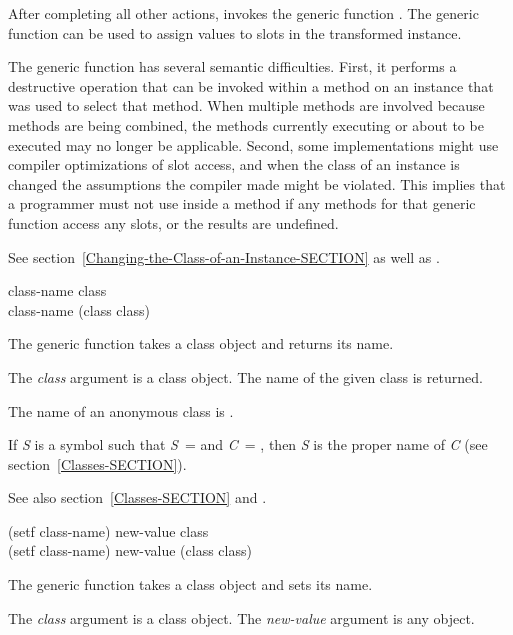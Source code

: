 \begin{defun}
After completing all other actions,  invokes the generic
function .  The generic function
can be used to assign values to slots in the transformed instance.

The generic function  has several semantic difficulties.
First, it performs a destructive operation that can be invoked within a
method on an instance that was used to select that method. When multiple
methods are involved because methods are being combined,
the methods currently executing or about to be executed
may no longer be applicable.  Second, some implementations might use compiler
optimizations of slot access, and when the class of an instance is
changed the assumptions the compiler made might be violated.
This implies that a programmer must not use 
 inside a method if any methods for that generic function 
access any slots, or the results are undefined.

See section~\ref{Changing-the-Class-of-an-Instance-SECTION} as well as
.
\end{defun}

\begin{defun}
class-name class \\
class-name (class class)

The generic function  takes a class object and returns its
name.

The \emph{class} argument is a class object.
The name of the given class is returned.

The name of an anonymous class is .

If \emph{S} is a symbol such that \emph{S}~= and \emph{C}~=
, then \emph{S} is the proper name of \emph{C} (see section~\ref{Classes-SECTION}).

See also section~\ref{Classes-SECTION} and .
\end{defun}

\begin{defun}
(setf class-name) new-value class \\
(setf class-name) new-value (class class)

The generic function  takes a class object and sets
its name.

The \emph{class} argument is a class object.
The \emph{new-value} argument is any object.
\end{defun}

